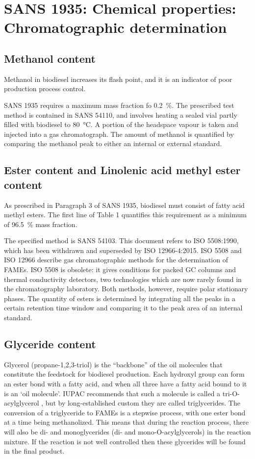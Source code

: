 \section{SANS 1935: Chemical properties: Chromatographic determination}
\label{sec:ChromDet}

\subsection{Methanol content}

Methanol in biodiesel increases its flash point, and it is an indicator of poor
production process control.

SANS 1935 requires a maximum mass fraction fo \SI{0.2}{\percent}. The prescribed
test method is contained in SANS 54110, and involves heating a sealed vial
partly filled with biodiesel to \SI{80}{\celsius}. A portion of the headspace
vapour is taken and injected into a gas chromatograph. The amount of methanol is
quantified by comparing the methanol peak to either an internal or external
standard.

\subsection{Ester content and Linolenic acid methyl ester content}
\label{sec:EsterContent}
As prescribed in Paragraph 3 of SANS 1935, biodiesel must consist of fatty acid
methyl esters. The first line of Table 1 quantifies this requirement as a
minimum of \SI{96.5}{\percent} mass fraction. 

The specified method is SANS 54103. This document refers to ISO 5508:1990, which
has been withdrawn and superseded by ISO 12966-4:2015. ISO 5508 and ISO 12966
describe gas chromatographic methods for the determination of FAMEs. ISO 5508 is
obsolete: it gives conditions for packed GC columns and thermal conductivity
detectors, two technologies which are now rarely found in the chromatography
laboratory. Both methods, however, require polar stationary phases. The quantity of
esters is determined by integrating all the peaks in a certain retention time
window and comparing it to the peak area of an internal standard.

\subsection{Glyceride content}
\label{sec:Glycerides}

Glycerol (propane-1,2,3-triol) is the ``backbone'' of the oil molecules that
constitute the feedstock for biodiesel production. Each hydroxyl group can form
an ester bond with a fatty acid, and when all three have a fatty acid bound to
it is an `oil molecule'. IUPAC recommends that such a molecule is called a
tri-O-acylglycerol \autocite{Nic2009}, but by long-established custom they are
called triglycerides. The conversion of a triglyceride to FAMEs is a stepwise
process, with one ester bond at a time being methanolized. This means that
during the reaction process, there will also be di- and monoglycerides (di- and
mono-O-acylglycerols) in the reaction mixture. If the reaction is not well
controlled then these glycerides will be found in the final product.

